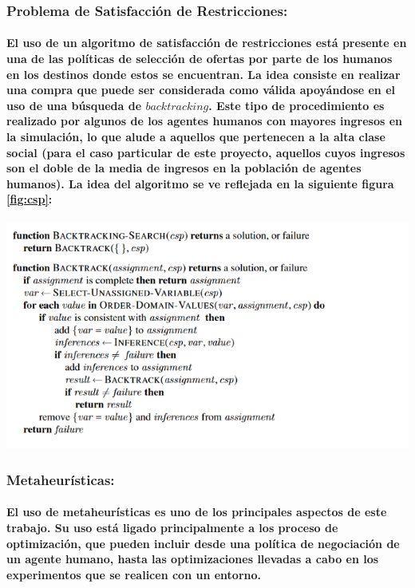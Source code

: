 \documentclass[12pt]{amsart}
\begin{document}
\subsubsection{Problema de Satisfacción de Restricciones:}

\paragraph{El uso de un algoritmo de satisfacción de restricciones está presente en una de las políticas de selección de ofertas por parte de los humanos en los destinos donde estos se encuentran. La idea consiste en realizar una compra que puede ser considerada como válida apoyándose en el uso de una búsqueda de $backtracking$. Este tipo de procedimiento es realizado por algunos de los agentes humanos con mayores ingresos en la simulación, lo que alude a aquellos que pertenecen a la alta clase social (para el caso particular de este proyecto, aquellos cuyos ingresos son el doble de la media de ingresos en la población de agentes humanos). La idea del algoritmo se ve reflejada en la siguiente figura \ref{fig:csp}:}

\begin{center}
	\includegraphics[scale=0.8]{./images/csp.png}
	\label{fig:csp}
\end{center}

\subsubsection{Metaheurísticas:}

\paragraph{El uso de metaheurísticas es uno de los principales aspectos de este trabajo. Su uso está ligado principalmente a los proceso de optimización, que pueden incluir desde una política de negociación de un agente humano, hasta las optimizaciones llevadas a cabo en los experimentos que se realicen con un entorno.}
\end{document}
